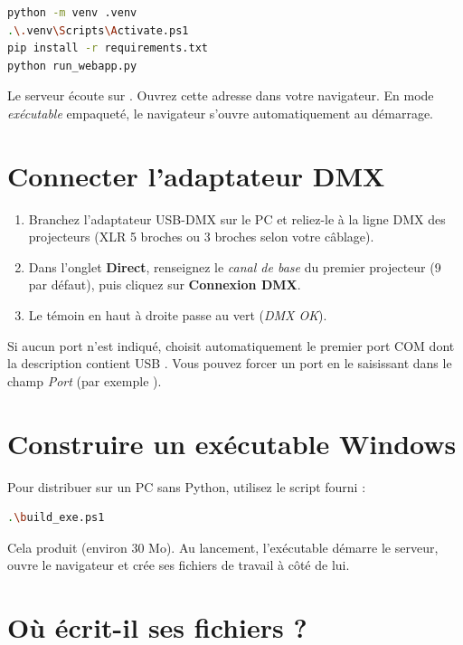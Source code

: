 \begin{lstlisting}[language=bash,caption={Installation et lancement en développement.}]
python -m venv .venv
.\.venv\Scripts\Activate.ps1
pip install -r requirements.txt
python run_webapp.py
\end{lstlisting}

Le serveur écoute sur . Ouvrez cette adresse dans
votre navigateur. En mode \emph{exécutable} empaqueté, le navigateur s'ouvre
automatiquement au démarrage.

\section{Connecter l'adaptateur DMX}

\begin{enumerate}[leftmargin=1.6em]
  \item Branchez l'adaptateur USB-DMX sur le PC et reliez-le à la ligne DMX des
        projecteurs (XLR 5 broches ou 3 broches selon votre câblage).
  \item Dans l'onglet \textbf{Direct}, renseignez le \emph{canal de base} du
        premier projecteur (9 par défaut), puis cliquez sur
        \textbf{Connexion DMX}.
  \item Le témoin en haut à droite passe au vert (\emph{DMX OK}).
\end{enumerate}

Si aucun port n'est indiqué, \Icare{} choisit automatiquement le premier port
COM dont la description contient \og USB \fg{}. Vous pouvez forcer un port en
le saisissant dans le champ \emph{Port} (par exemple ).

\section{Construire un exécutable Windows}

Pour distribuer \Icare{} sur un PC sans Python, utilisez le script fourni :

\begin{lstlisting}[language=bash,caption={Construction de l'exécutable autonome.}]
.\build_exe.ps1
\end{lstlisting}

Cela produit  (environ 30 Mo). Au
lancement, l'exécutable démarre le serveur, ouvre le navigateur et crée ses
fichiers de travail à côté de lui.

\section{Où \Icare{} écrit-il ses fichiers ?}

